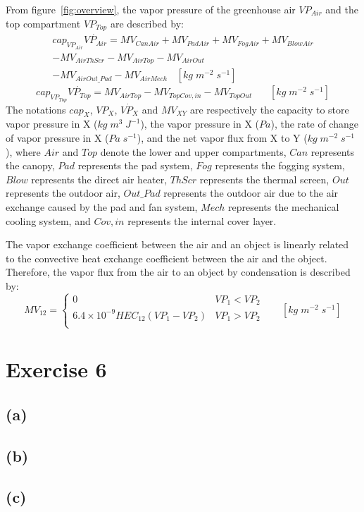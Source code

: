 \documentclass[a4paper]{article}
\begin{document}
From figure~\ref{fig:overview}, the vapor pressure of the greenhouse air \(VP_{Air}\) and the top compartment \(VP_{Top}\) are described by: \\
\begin{multline}
  cap_{VP_{Air}}\dot{VP_{Air}} = MV_{CanAir} + MV_{PadAir} + MV_{FogAir} + MV_{BlowAir} \\
  - MV_{AirThScr} - MV_{AirTop} - MV_{AirOut} \\
  - MV_{AirOut\_Pad} - MV_{AirMech} ~~~~ [kg\;m^{-2}\;s^{-1}]
\end{multline}
\begin{equation}
  cap_{VP_{Top}}\dot{VP_{Top}} = MV_{AirTop} - MV_{TopCov,in} - MV_{TopOut} ~~~~~~~~ [kg\;m^{-2}\;s^{-1}]
\end{equation}
The notations \(cap_X\), \(VP_X\), \(\dot{VP_X}\) and \(MV_{XY}\) are respectively the capacity to store vapor pressure in X (\(kg\;m^3\;J^{-1}\)),
the vapor pressure in X (\(Pa\)), the rate of change of vapor pressure in X (\(Pa\;s^{-1}\)), and the net vapor flux from X to Y (\(kg\;m^{-2}\;s^{-1}\)),
where \(Air\) and \(Top\) denote the lower and upper compartments, \(Can\) represents the canopy, \(Pad\) represents the pad system, \(Fog\) represents the fogging system,
\(Blow\) represents the direct air heater, \(ThScr\) represents the thermal screen, \(Out\) represents the outdoor air,
\(Out\_Pad\) represents the outdoor air due to the air exchange caused by the pad and fan system, \(Mech\) represents the mechanical cooling system,
and \(Cov,in\) represents the internal cover layer.

The vapor exchange coefficient between the air and an object is linearly related to the convective heat exchange coefficient between the air and the object.
Therefore, the vapor flux from the air to an object by condensation is described by:
\begin{equation}
  MV_{12} = \begin{cases}
    0                                        & VP_1 < VP_2 \\
    6.4 \times 10^{-9} HEC_{12}(VP_1 - VP_2) & VP_1 > VP_2 \\
  \end{cases}
  ~~~~~~~~ [kg\;m^{-2}\;s^{-1}]
\end{equation}

\newpage
\section{Exercise 6}
\subsection{(a)}

\subsection{(b)}

\subsection{(c)}

\begin{thebibliography}{80}






\end{thebibliography}
\end{document}
